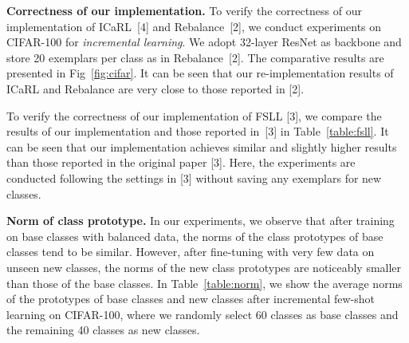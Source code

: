\documentclass{article}
\begin{document}
\textbf{Correctness of our implementation.}
To verify the correctness of our implementation of ICaRL\textsuperscript{}~[4] and Rebalance\textsuperscript{}~[2], we conduct experiments on CIFAR-100 for \emph{incremental learning}. We adopt 32-layer ResNet as backbone and store 20 exemplars per class as in Rebalance~[2]. The comparative results are presented in Fig~\ref{fig:cifar}. It can be seen that
our re-implementation results of ICaRL and Rebalance are very close to those reported in [2]. 

\begin{table*}[t]
\renewcommand\arraystretch{1.0}
\caption{Our re-implementation results of FSLL are very close to those reported in~[3] on CIFAR-100 for 5-way 5-shot incremental learning. \textsuperscript{} indicates our re-implementation. The results are obtained without saving any exemplars.} 
\label{table:fsll}
\centering
{}
\end{table*} 
To verify the correctness of our implementation of FSLL [3], we compare the results of our implementation and those reported in~[3] in Table~\ref{table:fsll}. It can be seen that our implementation achieves similar and slightly higher results than those reported in the original paper [3]. Here, the experiments are conducted following the settings in [3] without saving any exemplars for new classes. 

\textbf{Norm of class prototype.} In our experiments, we observe that after training on base classes with balanced data, the norms of the class prototypes of base classes tend to be similar. However, after fine-tuning with very few data on unseen new classes, the norms of the new class prototypes are noticeably smaller than those of the base classes. In Table~\ref{table:norm}, we show the average norms of the prototypes of base classes and new classes after incremental few-shot learning on CIFAR-100, where we randomly select 60 classes as base classes and the remaining 40 classes as new classes.
\end{document}
